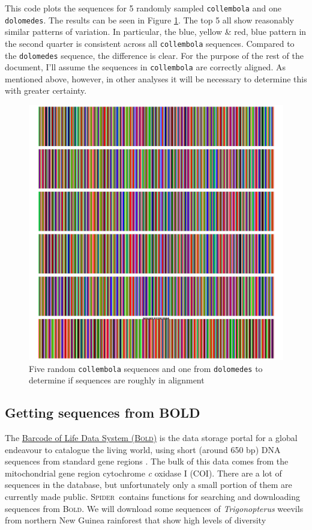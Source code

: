 \documentclass{article}
\newcommand{\spider}{\textsc{Spider}~} %
\newcommand{\scinm}{\emph}
\newcommand{\progname}[1]{\textsc{#1}}
\newcommand{\fun}[1]{\texttt{#1}}
\begin{document}
This code plots the sequences for 5 randomly sampled \fun{collembola} and one \fun{dolomedes}. The results can be seen in Figure \ref{seeBarcode.fig}. The top 5 all show reasonably similar patterns of variation. In particular, the blue, yellow \& red, blue pattern in the second quarter is consistent across all \fun{collembola} sequences. Compared to the \fun{dolomedes} sequence, the difference is clear. For the purpose of the rest of the document, I'll assume the sequences in \fun{collembola} are correctly aligned. As mentioned above, however, in other analyses it will be necessary to determine this with greater certainty.

\begin{figure}[tbp]
	\includegraphics[width=\textwidth]{seeBarcode}
	\caption{Five random \fun{collembola} sequences and one from \fun{dolomedes} to determine if sequences are roughly in alignment}
	\label{seeBarcode.fig}
\end{figure}



\subsection{Getting sequences from BOLD}
\label{BOLD.section}
The \href{http://www.barcodinglife.com}{Barcode of Life Data System (\progname{Bold})} is the data storage portal for a global endeavour to catalogue the living world, using short (around 650 bp) DNA sequences from standard gene regions \citep{Ratnasingham2007}. The bulk of this data comes from the mitochondrial gene region cytochrome \emph{c} oxidase I (COI). There are a lot of sequences in the database, but unfortunately only a small portion of them are currently made public. \spider contains functions for searching and downloading sequences from \progname{Bold}. We will download some sequences of \scinm{Trigonopterus} weevils from northern New Guinea rainforest that show high levels of diversity \citep{Ried.etal.2010,Ried.2010}
\end{document}
